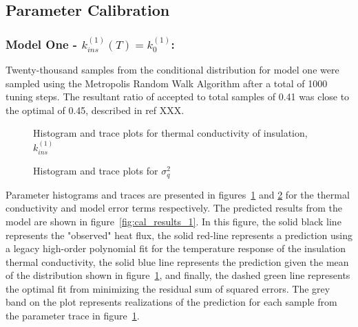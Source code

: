 \documentclass[article]{proc}
\begin{document}
    \subsection{Parameter Calibration}

        \subsubsection{Model One - $k^{(1)}_{ins}(T) = k^{(1)}_0$:}

        Twenty-thousand samples from the conditional distribution for model one were sampled using the Metropolis Random Walk Algorithm after a total of 1000 tuning steps. The resultant ratio of accepted to total samples of 0.41 was close to the optimal of 0.45, described in ref XXX.

        \begin{figure}[b!]
            \centering
            \qquad
            \caption{Histogram and trace plots for thermal conductivity of insulation, $k^{(1)}_{ins}$}
            \label{fig:param_trace_1}
        \end{figure}

        \begin{figure}[b!]
            \centering
            \qquad
            \caption{Histogram and trace plots for $\sigma_q^2$}
            \label{fig:sigma_trace_1}
        \end{figure}

        Parameter histograms and traces are presented in figures~\ref{fig:param_trace_1} and \ref{fig:sigma_trace_1} for the thermal conductivity and model error terms respectively. The predicted results from the model are shown in figure~\ref{fig:cal_results_1}. In this figure, the solid black line represents the "observed" heat flux, the solid red-line represents a prediction using a legacy high-order polynomial fit for the temperature response of the insulation thermal conductivity, the solid blue line represents the prediction given the mean of the distribution shown in figure~\ref{fig:param_trace_1}, and finally, the dashed green line represents the optimal fit from minimizing the residual sum of squared errors. The grey band on the plot represents realizations of the prediction for each sample from the parameter trace in figure~\ref{fig:param_trace_1}. 
\end{document}
